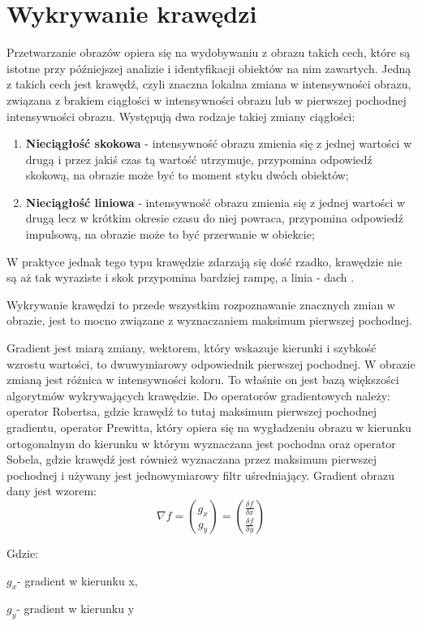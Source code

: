 \documentclass[eng,oneside]{mgr}
\begin{document}
\section{Wykrywanie krawędzi}
Przetwarzanie obrazów opiera się na wydobywaniu z obrazu takich cech, które są istotne przy późniejszej analizie i identyfikacji obiektów na nim zawartych. Jedną z takich cech jest krawędź, czyli znaczna lokalna zmiana w intensywności obrazu, związana z brakiem ciągłości w intensywności obrazu lub w pierwszej pochodnej intensywności obrazu. Występują dwa rodzaje takiej zmiany ciągłości:
\begin{enumerate}
\item \textbf{Nieciągłość skokowa} - intensywność obrazu zmienia się z jednej wartości w drugą i przez jakiś czas tą wartość utrzymuje, przypomina odpowiedź skokową, na obrazie może być to moment styku dwóch obiektów;
\item \textbf{Nieciągłość liniowa} - intensywność obrazu zmienia się z jednej wartości w drugą lecz w krótkim okresie czasu do niej powraca, przypomina odpowiedź impulsową, na obrazie może to być przerwanie w obiekcie; 
\end{enumerate}
\par W praktyce jednak tego typu krawędzie zdarzają się dość rzadko, krawędzie nie są aż tak wyraziste i skok przypomina bardziej rampę, a linia - dach \cite{krawedz}.

\par Wykrywanie krawędzi to przede wszystkim rozpoznawanie znacznych zmian w obrazie, jest to mocno związane z wyznaczaniem maksimum pierwszej pochodnej. 
\par Gradient jest miarą zmiany, wektorem, który wskazuje kierunki i szybkość wzrostu wartości, to dwuwymiarowy odpowiednik pierwszej pochodnej. W obrazie zmianą jest różnica w intensywności koloru. To właśnie on jest bazą większości algorytmów wykrywających krawędzie. Do operatorów gradientowych należy: operator Robertsa, gdzie krawędź to tutaj maksimum pierwszej pochodnej gradientu, operator Prewitta, który opiera się na wygładzeniu obrazu w kierunku ortogonalnym do kierunku w którym wyznaczana jest pochodna oraz operator Sobela, gdzie krawędź jest również wyznaczana przez maksimum pierwszej pochodnej i używany jest jednowymiarowy filtr uśredniający. Gradient obrazu dany jest wzorem:
\begin{equation}
\nabla f = \binom{g_x}{g_y} = \binom{\frac{\delta f}{\delta x}}{\frac{\delta f}{\delta y}}
\end{equation} 
\par Gdzie:
\par $g_x $- gradient w kierunku x,
\par $g_y $- gradient w kierunku y
\end{document}
